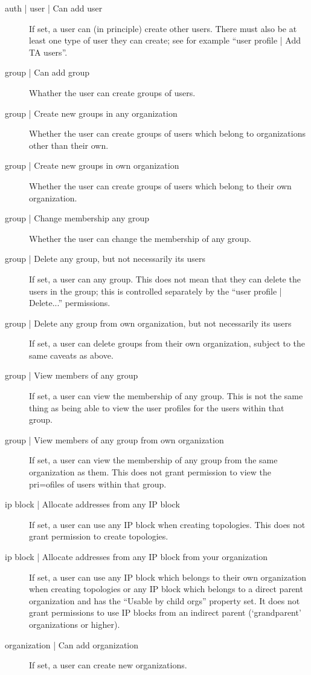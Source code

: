 \documentclass[a4paper,12pt]{report}
\begin{document}
\begin{description}
\item[auth | user | Can add user]  If set, a user can (in principle) create other users.  There must also be at least one type of user they can create; see for example ``user profile | Add TA users''.
\item[group | Can add group] Whather the user can create groups of users.
\item[group | Create new groups in any organization]  Whether the user can create groups of users which belong to organizations other than their own.
\item[group | Create new groups in own organization]  Whether the user can create groups of users which belong to their own organization.
\item[group | Change membership any group]  Whether the user can change the membership of any group.
\item[group | Delete any group, but not necessarily its users]  If set, a user can any group.  This does not mean that they can delete the users in the group; this is controlled separately by the ``user profile | Delete...'' permissions.
\item[group | Delete any group from own organization, but not necessarily its users]  If set, a user can delete groups from their own organization, subject to the same caveats as above.
\item[group | View members of any group]  If set, a user can view the membership of any group.  This is not the same thing as being able to view the user profiles for the users within that group.
\item[group | View members of any group from own organization]  If set, a user can view the membership of any group from the same organization as them.  This does not grant permission to view the pri=ofiles of users within that group.
\item[ip block | Allocate addresses from any IP block]  If set, a user can use any IP block when creating topologies.  This does not grant permission to create topologies.
\item[ip block | Allocate addresses from any IP block from your organization]  If set, a user can use any IP block which belongs to their own organization when creating topologies or any IP block which belongs to a direct parent organization and has the ``Usable by child orgs'' property set.  It does not grant permissions to use IP blocks from an indirect parent (`grandparent' organizations or higher).
\item[organization | Can add organization]  If set, a user can create new organizations.

\end{description}
\end{document}
